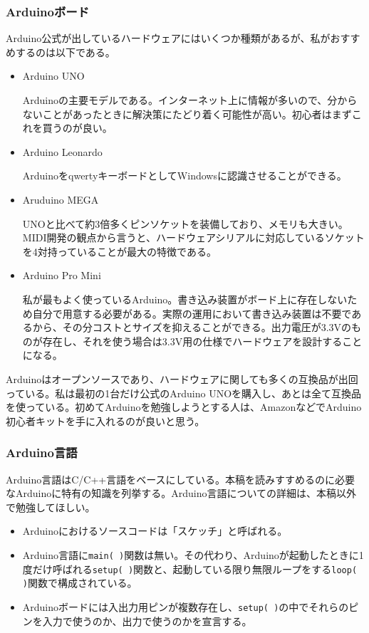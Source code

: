\documentclass[uplatex, 10pt, dvipdfmx]{jsarticle}
\numberwithin{equation}{section}
\begin{document}
\subsubsection{Arduinoボード}
Arduino公式が出しているハードウェアにはいくつか種類があるが、私がおすすめするのは以下である。
\begin{itemize}
\item Arduino UNO

Arduinoの主要モデルである。インターネット上に情報が多いので、分からないことがあったときに解決策にたどり着く可能性が高い。初心者はまずこれを買うのが良い。

\item Arduino Leonardo

ArduinoをqwertyキーボードとしてWindowsに認識させることができる\cite{EMA}。

\item Aruduino MEGA

UNOと比べて約3倍多くピンソケットを装備しており、メモリも大きい。MIDI開発の観点から言うと、ハードウェアシリアルに対応しているソケットを4対持っていることが最大の特徴である。

\item Arduino Pro Mini

私が最もよく使っているArduino。書き込み装置がボード上に存在しないため自分で用意する必要がある。実際の運用において書き込み装置は不要であるから、その分コストとサイズを抑えることができる。出力電圧が3.3Vのものが存在し、それを使う場合は3.3V用の仕様\cite{3.3V}でハードウェアを設計することになる。
\end{itemize}

Arduinoはオープンソースであり、ハードウェアに関しても多くの互換品が出回っている。私は最初の1台だけ公式のArduino UNOを購入し、あとは全て互換品を使っている。初めてArduinoを勉強しようとする人は、AmazonなどでArduino初心者キットを手に入れるのが良いと思う。

\subsubsection{Arduino言語}
Arduino言語はC/C++言語をベースにしている。本稿を読みすすめるのに必要なArduinoに特有の知識を列挙する。Arduino言語についての詳細は、本稿以外で勉強してほしい。
\begin{itemize}
\item Arduinoにおけるソースコードは「スケッチ」と呼ばれる。
\item Arduino言語に\texttt{main( )}関数は無い。その代わり、Arduinoが起動したときに1度だけ呼ばれる\texttt{setup( )}関数と、起動している限り無限ループをする\texttt{loop( )}関数で構成されている。
\item Arduinoボードには入出力用ピンが複数存在し、\texttt{setup( )}の中でそれらのピンを入力で使うのか、出力で使うのかを宣言する。
\end{itemize}
\end{document}
